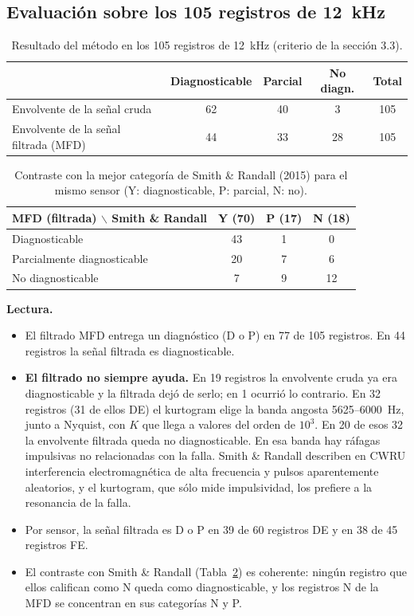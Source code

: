 \documentclass[11pt,a4paper]{article}
\begin{document}
\subsection{Evaluación sobre los 105 registros de 12~kHz}
\begin{table}[H]\centering\small
\begin{tabular}{@{}lccc|c@{}}\toprule
 & Diagnosticable & Parcial & No diagn. & Total\\\midrule
Envolvente de la señal cruda & 62 & 40 & 3 & 105\\
Envolvente de la señal filtrada (MFD) & 44 & 33 & 28 & 105\\
\bottomrule\end{tabular}
\caption{Resultado del método en los 105 registros de 12~kHz (criterio de la sección 3.3).}\label{tab:todos}\end{table}
\begin{table}[H]\centering\small
\begin{tabular}{@{}lccc@{}}\toprule
MFD (filtrada) $\backslash$ Smith \& Randall & Y (70) & P (17) & N (18)\\\midrule
Diagnosticable & 43 & 1 & 0\\
Parcialmente diagnosticable & 20 & 7 & 6\\
No diagnosticable & 7 & 9 & 12\\
\bottomrule\end{tabular}
\caption{Contraste con la mejor categoría de Smith \& Randall (2015) para el mismo sensor (Y: diagnosticable, P: parcial, N: no).}\label{tab:sr}\end{table}

\noindent\textbf{Lectura.}
\begin{itemize}[itemsep=2pt]
\item El filtrado MFD entrega un diagnóstico (D o P) en 77 de 105 registros. En 44 registros la señal filtrada es diagnosticable.
\item \textbf{El filtrado no siempre ayuda.} En 19 registros la envolvente cruda ya era diagnosticable y la filtrada dejó de serlo; en 1 ocurrió lo contrario. En 32 registros (31 de ellos DE) el kurtogram elige la banda angosta 5625--6000~Hz, junto a Nyquist, con $K$ que llega a valores del orden de $10^3$. En 20 de esos 32 la envolvente filtrada queda no diagnosticable. En esa banda hay ráfagas impulsivas no relacionadas con la falla. Smith \& Randall describen en CWRU interferencia electromagnética de alta frecuencia y pulsos aparentemente aleatorios, y el kurtogram, que sólo mide impulsividad, los prefiere a la resonancia de la falla.
\item Por sensor, la señal filtrada es D o P en 39 de 60 registros DE y en 38 de 45 registros FE.
\item El contraste con Smith \& Randall (Tabla~\ref{tab:sr}) es coherente: ningún registro que ellos califican como N queda como diagnosticable, y los registros N de la MFD se concentran en sus categorías N y P.
\end{itemize}
\end{document}
